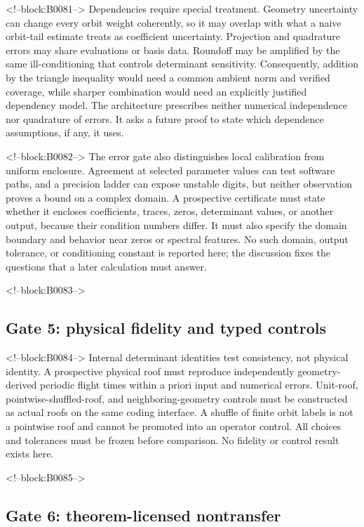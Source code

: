 \documentclass[11pt,a4paper]{article}
\begin{document}
<!--block:B0081-->
Dependencies require special treatment. Geometry uncertainty can change every orbit weight coherently, so it may overlap with what a naive orbit-tail estimate treats as coefficient uncertainty. Projection and quadrature errors may share evaluations or basis data. Roundoff may be amplified by the same ill-conditioning that controls determinant sensitivity. Consequently, addition by the triangle inequality would need a common ambient norm and verified coverage, while sharper combination would need an explicitly justified dependency model. The architecture prescribes neither numerical independence nor quadrature of errors. It asks a future proof to state which dependence assumptions, if any, it uses.

<!--block:B0082-->
The error gate also distinguishes local calibration from uniform enclosure. Agreement at selected parameter values can test software paths, and a precision ladder can expose unstable digits, but neither observation proves a bound on a complex domain. A prospective certificate must state whether it encloses coefficients, traces, zeros, determinant values, or another output, because their condition numbers differ. It must also specify the domain boundary and behavior near zeros or spectral features. No such domain, output tolerance, or conditioning constant is reported here; the discussion fixes the questions that a later calculation must answer.

<!--block:B0083-->
\subsection{Gate 5: physical fidelity and typed controls}

<!--block:B0084-->
Internal determinant identities test consistency, not physical identity. A prospective physical roof must reproduce independently geometry-derived periodic flight times within a priori input and numerical errors. Unit-roof, pointwise-shuffled-roof, and neighboring-geometry controls must be constructed as actual roofs on the same coding interface. A shuffle of finite orbit labels is not a pointwise roof and cannot be promoted into an operator control. All choices and tolerances must be frozen before comparison. No fidelity or control result exists here.

<!--block:B0085-->
\subsection{Gate 6: theorem-licensed nontransfer}
\end{document}
